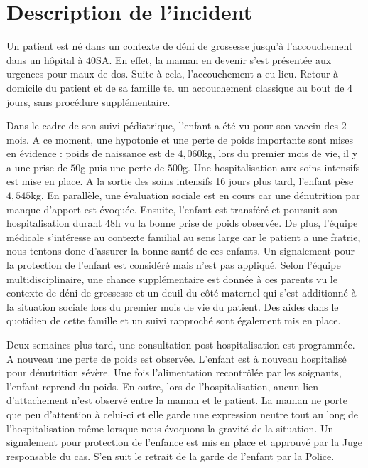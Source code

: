 \section{Description de l'incident}

Un patient est né dans un contexte de déni de grossesse jusqu’à l’accouchement dans un hôpital à $40$SA. En effet, la maman en devenir s’est présentée aux urgences pour maux de dos. Suite à cela, l’accouchement a eu lieu. Retour à domicile du patient et de sa famille tel un accouchement classique au bout de $4$ jours, sans procédure supplémentaire.

Dans le cadre de son suivi pédiatrique, l’enfant a été vu pour son vaccin des $2$ mois. A ce moment, une hypotonie et une perte de poids importante sont mises en évidence : poids de naissance est de $4,060$kg, lors du premier mois de vie, il y a une prise de $50$g puis une perte de $500$g. Une hospitalisation aux soins intensifs est mise en place. A la sortie des soins intensifs 16 jours plus tard, l’enfant pèse $4,545$kg. En parallèle, une évaluation sociale est en cours car une dénutrition par manque d’apport est évoquée. Ensuite, l’enfant est transféré et poursuit son hospitalisation durant $48$h vu la bonne prise de poids observée. De plus, l’équipe médicale s’intéresse au contexte familial au sens large car le patient a une fratrie, nous tentons donc d’assurer la bonne santé de ces enfants. Un signalement pour la protection de l’enfant est considéré mais n’est pas appliqué. Selon l’équipe multidisciplinaire, une chance supplémentaire est donnée à ces parents vu le contexte de déni de grossesse et un deuil du côté maternel qui s’est additionné à la situation sociale lors du premier mois de vie du patient. Des aides dans le quotidien de cette famille et un suivi rapproché sont également mis en place.

Deux semaines plus tard, une consultation post-hospitalisation est programmée. A nouveau une perte de poids est observée. L’enfant est à nouveau hospitalisé pour dénutrition sévère. Une fois l’alimentation recontrôlée par les soignants, l’enfant reprend du poids. En outre, lors de l’hospitalisation, aucun lien d’attachement n’est observé entre la maman et le patient. La maman ne porte que peu d’attention à celui-ci et elle garde une expression neutre tout au long de l’hospitalisation même lorsque nous évoquons la gravité de la situation. Un signalement pour protection de l’enfance est mis en place et approuvé par la Juge responsable du cas. S’en suit le retrait de la garde de l’enfant par la Police.

